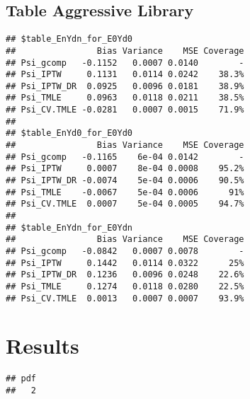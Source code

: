 \documentclass[11pt]{article}\usepackage[]{graphicx}\usepackage[]{color}
\makeatletter
\newenvironment{kframe}{%
 \def\at@end@of@kframe{}%
 \ifinner\ifhmode%
  \def\at@end@of@kframe{\end{minipage}}%
  \begin{minipage}{\columnwidth}%
 \fi\fi%
 \def\FrameCommand##1{\hskip\@totalleftmargin \hskip-\fboxsep
 \colorbox{shadecolor}{##1}\hskip-\fboxsep
     \hskip-\linewidth \hskip-\@totalleftmargin \hskip\columnwidth}%
 \MakeFramed {\advance\hsize-\width
   \@totalleftmargin\z@ \linewidth\hsize
   \@setminipage}}%
 {\par\unskip\endMakeFramed%
 \at@end@of@kframe}
\newenvironment{knitrout}{}{} %
\makeatother
\begin{document}
\subsection{Table Aggressive Library}
\begin{knitrout}
\color{fgcolor}\begin{kframe}
\begin{verbatim}
## $table_EnYdn_for_E0Yd0
##                Bias Variance    MSE Coverage
## Psi_gcomp   -0.1152   0.0007 0.0140        -
## Psi_IPTW     0.1131   0.0114 0.0242    38.3%
## Psi_IPTW_DR  0.0925   0.0096 0.0181    38.9%
## Psi_TMLE     0.0963   0.0118 0.0211    38.5%
## Psi_CV.TMLE -0.0281   0.0007 0.0015    71.9%
## 
## $table_EnYd0_for_E0Yd0
##                Bias Variance    MSE Coverage
## Psi_gcomp   -0.1165    6e-04 0.0142        -
## Psi_IPTW     0.0007    8e-04 0.0008    95.2%
## Psi_IPTW_DR -0.0074    5e-04 0.0006    90.5%
## Psi_TMLE    -0.0067    5e-04 0.0006      91%
## Psi_CV.TMLE  0.0007    5e-04 0.0005    94.7%
## 
## $table_EnYdn_for_E0Ydn
##                Bias Variance    MSE Coverage
## Psi_gcomp   -0.0842   0.0007 0.0078        -
## Psi_IPTW     0.1442   0.0114 0.0322      25%
## Psi_IPTW_DR  0.1236   0.0096 0.0248    22.6%
## Psi_TMLE     0.1274   0.0118 0.0280    22.5%
## Psi_CV.TMLE  0.0013   0.0007 0.0007    93.9%
\end{verbatim}
\end{kframe}
\end{knitrout}



\section{Results}
\begin{knitrout}
\color{fgcolor}\begin{kframe}
\begin{verbatim}
## pdf 
##   2
\end{verbatim}
\end{kframe}
\end{knitrout}
\end{document}
